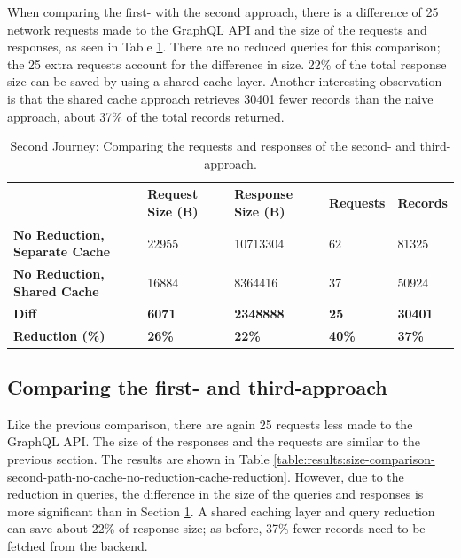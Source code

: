 When comparing the first- with the second approach, there is a difference of 25 network requests made to the GraphQL \ac{API} and the size of the requests and responses, as seen in Table \ref{table:results:size-comparison-second-path-cache-no-reduction-cache-reduction}. There are no reduced queries for this comparison; the 25 extra requests account for the difference in size. 22\% of the total response size can be saved by using a shared cache layer. Another interesting observation is that the shared cache approach retrieves 30401 fewer records than the naive approach, about 37\% of the total records returned.

\ifshowTables
\begin{table}[H]
  \begin{tabular}{|l|l|l|l|l|}
  \hline
  & \textbf{Request Size (B)} & \textbf{Response Size (B)} & \textbf{Requests} & \textbf{Records} \\
  \hline
  \textbf{No Reduction, Separate Cache} & 22955 & 10713304 & 62 & 81325 \\
  \hline
  \textbf{No Reduction, Shared Cache} & 16884 & 8364416 & 37 & 50924 \\
  \hline
  \hline
  \textbf{Diff} & \textbf{6071} & \textbf{2348888} & \textbf{25} & \textbf{30401} \\
  \hline
  \textbf{Reduction (\%)} & \textbf{26\%} & \textbf{22\%} & \textbf{40\%} & \textbf{37\%} \\
  \hline
  \end{tabular}
  \caption{Second Journey: Comparing the requests and responses of the second- and third-approach.}\label{table:results:size-comparison-second-path-cache-no-reduction-cache-reduction}
\end{table}
\fi

\subsection{Comparing the first- and third-approach}\label{subsection:results:comparison-second-path-second-third-approach}

Like the previous comparison, there are again 25 requests less made to the GraphQL \ac{API}. The size of the responses and the requests are similar to the previous section. The results are shown in Table \ref{table:results:size-comparison-second-path-no-cache-no-reduction-cache-reduction}. However, due to the reduction in queries, the difference in the size of the queries and responses is more significant than in Section \ref{table:results:size-comparison-second-path-cache-no-reduction-cache-reduction}. A shared caching layer and query reduction can save about 22\% of response size; as before, 37\% fewer records need to be fetched from the backend.

